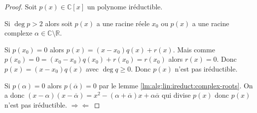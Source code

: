 \begin{proof}
Soit $p(x)\in\mathbb{C}[x]$ un polynome iréductible.

Si $\deg p>2$ alors soit $p(x)$ a une racine réele $x_0$ ou $p(x)$ a une racine complexe $\alpha\in\mathbb{C}\setminus\mathbb{R}$.

Si $p(x_0)=0$ alors $p(x)=(x-x_0)q(x)+r(x)$. Mais comme $p(x_0)=0=(x_0-x_0)q(x_0)+r(x_0)=r(x_0)$ alors $r(x)=0$. Donc $p(x)=(x-x_0)q(x)$ avec $\deg q\geq0$. Donc $p(x)$ n'est pas iréductible.

Si $p(\alpha)=0$ alors $p(\overline{\alpha})=0$ par le lemme \ref{lm:alg:lin:ireduct:complex-roots}. On a donc $(x-\alpha)(x-\overline{\alpha})=x^2-(\alpha+\overline{\alpha})x+\alpha\overline{\alpha}$ qui divise $p(x)$ donc $p(x)$ n'est pas iréductible. $\Longrightarrow\Longleftarrow$
\end{proof}
